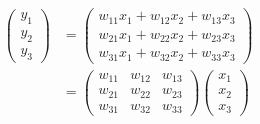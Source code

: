 \documentclass[../../../topic_deep-learning]{subfiles}
\begin{document}
\begin{align*}
  \begin{pmatrix}
    y_1 \\
    y_2 \\
    y_3
  \end{pmatrix} & = \begin{pmatrix}
                      w_{11} x_1 + w_{12} x_2 + w_{13} x_3 \\
                      w_{21} x_1 + w_{22} x_2 + w_{23} x_3 \\
                      w_{31} x_1 + w_{32} x_2 + w_{33} x_3
                    \end{pmatrix} \\
                  & = \begin{pmatrix}
                        w_{11} & w_{12} & w_{13} \\
                        w_{21} & w_{22} & w_{23} \\
                        w_{31} & w_{32} & w_{33}
                      \end{pmatrix}
  \begin{pmatrix}
    x_1 \\
    x_2 \\
    x_3
  \end{pmatrix}                                         \\
\end{align*}
\end{document}
